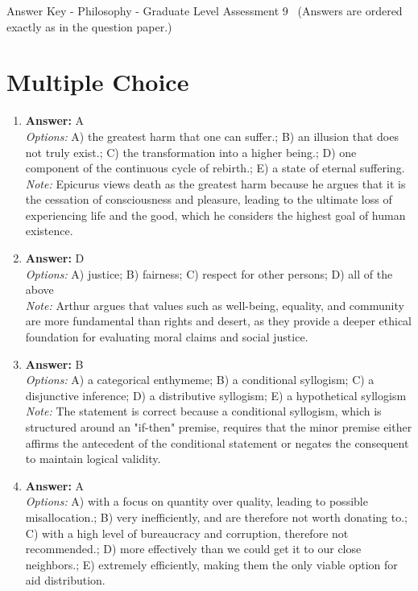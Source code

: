 \documentclass[12pt]{article}
\begin{document}
\begin{center}
Answer Key - Philosophy - Graduate Level Assessment 9 \
\small (Answers are ordered exactly as in the question paper.)
\end{center}

\section*{Multiple Choice}
\begin{enumerate}[label=\arabic*.]
\item \textbf{Answer:} A
\\ \textit{Options:} A) the greatest harm that one can suffer.; B) an illusion that does not truly exist.; C) the transformation into a higher being.; D) one component of the continuous cycle of rebirth.; E) a state of eternal suffering.
\\ \textit{Note:} Epicurus views death as the greatest harm because he argues that it is the cessation of consciousness and pleasure, leading to the ultimate loss of experiencing life and the good, which he considers the highest goal of human existence.
\item \textbf{Answer:} D
\\ \textit{Options:} A) justice; B) fairness; C) respect for other persons; D) all of the above
\\ \textit{Note:} Arthur argues that values such as well-being, equality, and community are more fundamental than rights and desert, as they provide a deeper ethical foundation for evaluating moral claims and social justice.
\item \textbf{Answer:} B
\\ \textit{Options:} A) a categorical enthymeme; B) a conditional syllogism; C) a disjunctive inference; D) a distributive syllogism; E) a hypothetical syllogism
\\ \textit{Note:} The statement is correct because a conditional syllogism, which is structured around an "if-then" premise, requires that the minor premise either affirms the antecedent of the conditional statement or negates the consequent to maintain logical validity.
\item \textbf{Answer:} A
\\ \textit{Options:} A) with a focus on quantity over quality, leading to possible misallocation.; B) very inefficiently, and are therefore not worth donating to.; C) with a high level of bureaucracy and corruption, therefore not recommended.; D) more effectively than we could get it to our close neighbors.; E) extremely efficiently, making them the only viable option for aid distribution.

\end{enumerate}
\end{document}
